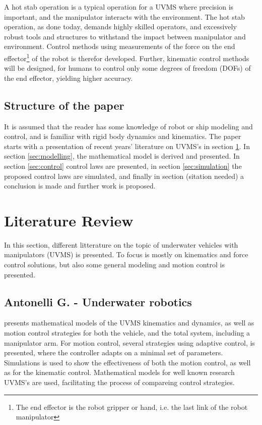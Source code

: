 A hot stab operation is a typical operation for a UVMS where precision is important, and the manipulator interacts with the environment. The hot stab operation, as done today, demands highly skilled operators, and excessively robust tools and structures to withstand the impact between manipulator and environment.  Control methods using measurements of the force on the end effector\footnote{The end effector is the robot gripper or hand, i.e. the last link of the robot manipulator} of the robot is therefor developed. Further, kinematic control methods will be designed, for humans to control only some degrees of freedom (DOFs) of the end effector, yielding higher accuracy.

\subsection{Structure of the paper} 
It is assumed that the reader has some knowledge of robot or ship modeling and control, and is familiar with rigid body dynamics and kinematics. The paper starts with a presentation of recent years' literature on UVMS's in section \ref{sec:literature}. In section \ref{sec:modelling}, the mathematical model is derived and presented.
In section \ref{sec:control} control laws are presented, in section \ref{sec:simulation} the proposed control laws are simulated, and finally in section (sitation needed) a conclusion is made and further work is proposed.

\clearpage
\section{Literature Review}
\label{sec:literature}
In this section, different litterature on the topic of underwater vehicles with manipulators (UVMS) is presented. To focus is mostly on kinematics and force control solutions, but also some general modeling and motion control is presented.  
\\

\subsection{Antonelli G. - Underwater robotics}

\cite{antonelli1} presents mathematical models of the UVMS kinematics and dynamics, as well as motion control strategies for both the vehicle, and the total system, including a manipulator arm. For motion control, several strategies using adaptive control, is presented, where the controller adapts on a minimal set of parameters. Simulations is used to show the effectiveness of both the motion control, as well as for the kinematic control. Mathematical models for well known research UVMS's are used, facilitating the process of compareing control strategies. 


